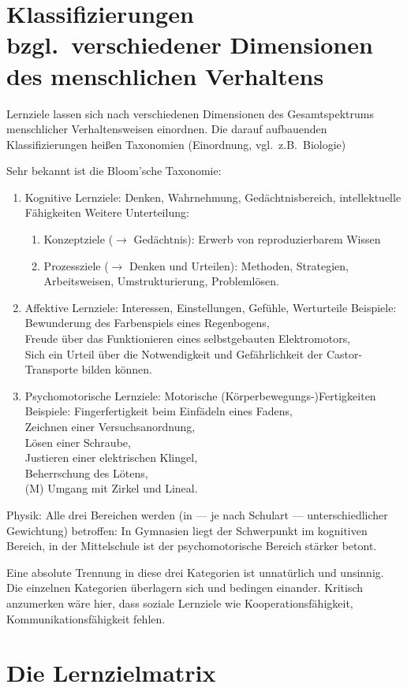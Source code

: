 \bip\bip
\section{Klassifizierungen bzgl.\ verschiedener
                Dimensionen des menschlichen Verhaltens}
Lernziele lassen sich nach verschiedenen Dimensionen des
Gesamtspektrums menschlicher Verhaltensweisen einordnen.
Die darauf aufbauenden Klassifizierungen hei{\ss}en Taxonomien
(Einordnung, vgl.\ z.B.\ Biologie)

Sehr bekannt ist die Bloom'sche Taxonomie:
\begin{enumerate}
\item Kognitive Lernziele:
Denken, Wahrnehmung, Ged\"{a}chtnisbereich, intellektuelle
F\"{a}higkeiten
\mip
Weitere Unterteilung:
\begin{enumerate}
\item
Konzeptziele ($\to$ Ged\"{a}chtnis):
Erwerb von reproduzierbarem Wissen
\item
Prozessziele ($\to$ Denken und Urteilen): Methoden, Strategien,
Arbeitsweisen, Umstrukturierung, Probleml\"{o}sen.
\end{enumerate}

\item Affektive Lernziele:
Interessen, Einstellungen, Gef\"{u}hle, Werturteile
\mip
Beispiele:
Bewunderung des Farbenspiels eines Regenbogens, \\
Freude \"{u}ber das Funktionieren eines selbstgebauten
Elektromotors, \\
Sich ein Urteil \"{u}ber die Notwendigkeit und Gef\"{a}hrlichkeit der
Castor-Transporte bilden k\"{o}nnen.

\item Psychomotorische Lernziele:
Motorische (K\"{o}rperbewegungs-)Fertigkeiten
\mip
Beispiele:
Fingerfertigkeit beim Einf\"{a}deln eines Fadens, \\
Zeichnen einer Versuchsanordnung, \\
L\"{o}sen einer Schraube, \\
Justieren einer elektrischen Klingel, \\
Beherrschung des L\"{o}tens, \\
(M) Umgang mit Zirkel und Lineal.
\end{enumerate}

Physik: Alle drei Bereichen werden (in --- je nach
Schulart --- unterschiedlicher Gewichtung)
betroffen: In Gymnasien liegt der Schwerpunkt im
kognitiven Bereich, in der Mittelschule ist der psychomotorische
Bereich st\"{a}rker betont.

\mip
Eine absolute Trennung in diese drei Kategorien ist unnat\"{u}rlich
und unsinnig.
Die einzelnen Kategorien \"{u}berlagern sich und bedingen einander.
\mip
Kritisch anzumerken w\"{a}re hier, dass soziale Lernziele wie
Kooperationsf\"{a}higkeit, Kommunikationsf\"{a}higkeit fehlen.

\bip\bip
\section{Die Lernzielmatrix}

